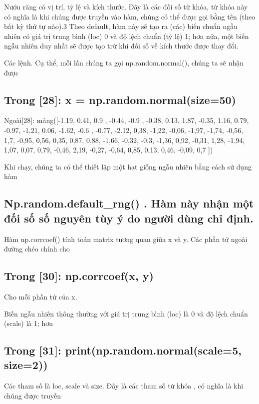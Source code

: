 Nướu răng có vị trí, tỷ lệ và kích thước. Đây là các đối số từ khóa, từ khóa này có nghĩa là khi chúng được truyền vào hàm, chúng có thể được gọi bằng tên (theo bất kỳ thứ tự nào).3 Theo default, hàm này sẽ tạo ra (các) biến chuẩn ngẫu nhiên có giá trị trung bình (loc) 0 và độ lệch chuẩn (tỷ lệ) 1; hơn nữa, một biến ngẫu nhiên duy nhất sẽ được tạo trừ khi đối số về kích thước được thay đổi.

Các lệnh. Cụ thể, mỗi lần chúng ta gọi np.random.normal(), chúng ta sẽ nhận được

\subsection{Trong [28]: x = np.random.normal(size=50)}

Ngoài[28]: mảng([-1.19, 0.41, 0.9 , -0.44, -0.9 , -0.38, 0.13, 1.87, -0.35, 1.16, 0.79, -0.97, -1.21, 0.06, -1.62, -0.6 , -0.77, -2.12, 0,38, -1,22, -0,06, -1,97, -1,74, -0,56, 1,7, -0,95, 0,56, 0,35, 0,87, 0,88, -1,66, -0,32, -0,3, -1,36, 0,92, -0,31, 1,28, -1,94, 1,07, 0,07, 0,79, -0,46, 2,19, -0,27, -0,64, 0,85, 0,13, 0,46, -0,09, 0,7 ])

Khi chạy, chúng ta có thể thiết lập một hạt giống ngẫu nhiên bằng cách sử dụng hàm

\subsection{Np.random.default\_rng() . Hàm này nhận một đối số số nguyên tùy ý do người dùng chỉ định.}

Hàm np.corrcoef() tính toán matrix tương quan giữa x và y. Các phần tử ngoài đường chéo chính cho

\subsection{Trong [30]: np.corrcoef(x, y)}

Cho mỗi phần tử của x.

Biến ngẫu nhiên thông thường với giá trị trung bình (loc) là 0 và độ lệch chuẩn (scale) là 1; hơn

\subsection{Trong [31]: print(np.random.normal(scale=5, size=2))}

Các tham số là loc, scale và size. Đây là các tham số từ khóa , có nghĩa là khi chúng được truyền

